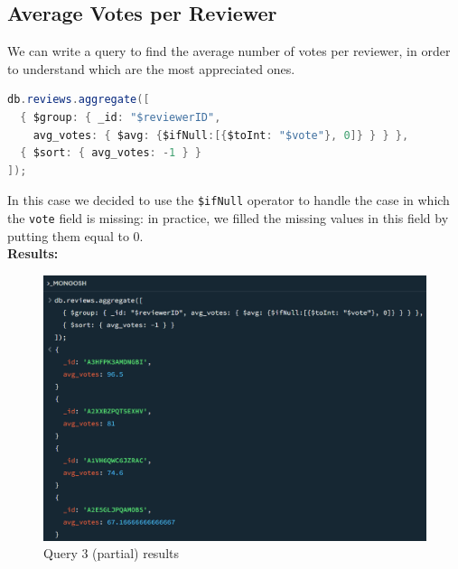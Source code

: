 \subsection{Average Votes per Reviewer}
We can write a query to find the average number of votes per reviewer, in order to understand which are the most appreciated ones. \\
\begin{lstlisting}[language=Java]
db.reviews.aggregate([
  { $group: { _id: "$reviewerID", 
    avg_votes: { $avg: {$ifNull:[{$toInt: "$vote"}, 0]} } } },
  { $sort: { avg_votes: -1 } }
]);
\end{lstlisting}
In this case we decided to use the \texttt{\$ifNull} operator to handle the case in which the \texttt{vote} field is missing: in practice, we filled the missing values in this field by putting them equal to 0. \\
\textbf{Results:}
\begin{figure}[H]
  \centering
  \includegraphics[scale=0.6]{Images/q3_result.png}
  \caption{Query 3 (partial) results}
  \label{fig:q3_result}
\end{figure}

\newpage
